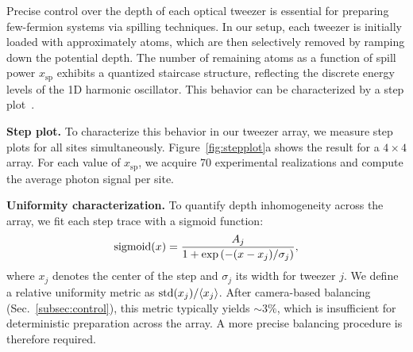 



Precise control over the depth of each optical tweezer is essential for preparing few-fermion systems via spilling techniques. In our setup, each tweezer is initially loaded with approximately  atoms, which are then selectively removed by ramping down the potential depth. The number of remaining atoms as a function of spill power $x_{\mathrm{sp}}$ exhibits a quantized staircase structure, reflecting the discrete energy levels of the 1D harmonic oscillator. This behavior can be characterized by a step plot~\cite{holten_pauli_2022}.

\textbf{Step plot.}
To characterize this behavior in our tweezer array, we measure step plots for all sites simultaneously. Figure~\ref{fig:stepplot}a shows the result for a $4 \times 4$ array. For each value of $x_{\mathrm{sp}}$, we acquire 70 experimental realizations and compute the average photon signal per site. 

\textbf{Uniformity characterization.}
To quantify depth inhomogeneity across the array, we fit each step trace with a sigmoid function:
\begin{equation*}
    \mathop{\mathrm{sigmoid}}\nolimits(x) = \frac{A_j}{1 + \exp\left(-(x - x_j)/\sigma_j\right)},
\end{equation*}
where $x_j$ denotes the center of the step and $\sigma_j$ its width for tweezer $j$. We define a relative uniformity metric as $\mathop{\mathrm{std}}\nolimits(x_j) / \langle x_j \rangle$. After camera-based balancing (Sec.~\ref{subsec:control}), this metric typically yields $\sim 3\%$, which is insufficient for deterministic preparation across the array. A more precise balancing procedure is therefore required.




